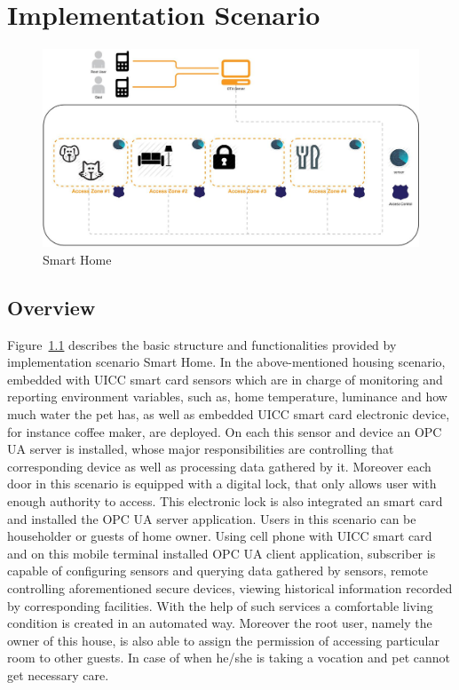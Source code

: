 \chapter{Implementation Scenario}
 \begin{figure}[!htbp]
	\centering
	\includegraphics[width=1\textwidth]{homeoverview.jpg}
		\caption{Smart Home}
	\label{fig:SmartHome}
\end{figure}

\section{Overview}
Figure~\ref{fig:SmartHome} describes the basic structure and functionalities provided by implementation scenario Smart Home.
In the above-mentioned housing scenario, embedded with UICC smart card sensors which are in charge of monitoring and reporting environment variables, such as, home temperature, luminance and how much water the pet has, as well as embedded UICC smart card electronic device, for instance coffee maker, are deployed. On each this sensor and device an OPC UA server is installed, whose major responsibilities are controlling that corresponding device as well as processing data gathered by it.  Moreover each door in this scenario is equipped with a digital lock, that only allows user with enough authority to access. This electronic lock is also integrated an smart card and installed the OPC UA server application. Users in this scenario can be householder or guests of home owner. Using cell phone with UICC smart card and on this mobile terminal installed OPC UA client application, subscriber is capable of configuring sensors and querying data gathered by sensors, remote controlling aforementioned secure devices, viewing historical information recorded by corresponding facilities. With the help of such services a comfortable living condition is created in an automated way.  Moreover the root user, namely the owner of this house, is also able to assign the permission of accessing particular room to other guests. In case of when he/she is taking a vocation and pet cannot get necessary care.


